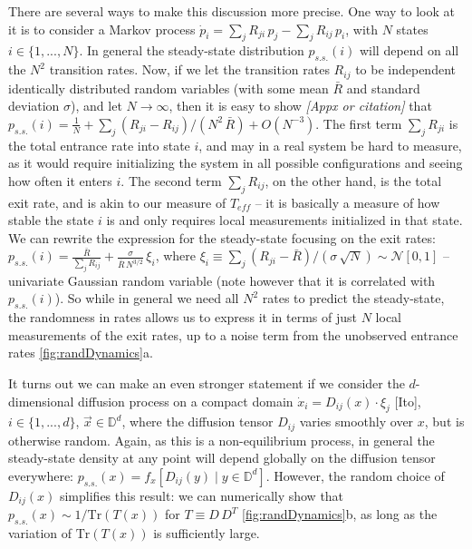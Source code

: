 \documentclass[reprint,prx]{revtex4-1}
\renewcommand{\v}[1]{\ensuremath{\vec{#1}}} %
\newcommand{\tr}{\mbox{Tr}}
\renewcommand{\=}[1]{\stackrel{#1}{=}} %
\renewcommand{\(}{\left (}
\renewcommand{\)}{\right  )}
\renewcommand{\[}{\left [}
\renewcommand{\]}{\right ]}
\newcommand{\<}{\left <}
\renewcommand{\>}{\right >}
\theoremstyle{definition}
\theoremstyle{remark}
\newcommand{\bigO}[1]{O(#1)}  %
\renewcommand{\todo}[1]{\textit{\color{red}[#1]}}
\begin{document}
There are several ways to make this discussion more precise. One way to look at it is to consider a Markov process $ \dot{p}_i= \sum_j R_{ji}\, p_j - \sum_j R_{ij}\, p_i $, with $ N $ states $ i\in\{1,...,N\} $. In general the steady-state distribution $ p_{s.s.}(i) $ will depend on all the $ N^2 $ transition rates. Now, if we let the transition rates $ R_{ij} $ to be independent identically distributed random variables (with some mean $ \bar{R} $ and standard deviation $ \sigma $), and let $ N \rightarrow \infty$, then it is easy to show \todo{Appx or citation} that $ p_{s.s.}(i)= \frac{1}{N} + \sum_j (R_{ji} - R_{ij})/(N^2\,\bar{R}) + \bigO{N^{-3}}$. The first term $ \sum_j R_{ji} $ is the total entrance rate into state $ i $, and may in a real system be hard to measure, as it would require initializing the system in all possible configurations and seeing how often it enters $ i $. The second term $ \sum_j R_{ij} $, on the other hand, is the total exit rate, and is akin to our measure of $ T_{eff} $ -- it is basically a measure of how stable the state $ i $ is and only requires local measurements initialized in that state. We can rewrite the expression for the steady-state focusing on the exit rates: $ p_{s.s.}(i)= \frac{\bar{R}}{\sum_j R_{ij}} + \frac{\sigma}{\bar{R}\,N^{3/2}}\, \xi_i$, where $ \xi_i \equiv  \sum_j \(R_{ji}-\bar{R}\)/\(\sigma\,\sqrt{N}\)\sim 
\mathcal{N}[0,1]$ -- univariate Gaussian random variable (note however that it is correlated with $ p_{s.s.}(i) $). So while in general we need all $ N^2 $ rates to predict the steady-state, the randomness in rates allows us to express it in terms of just $ N $ local measurements of the exit rates, up to a noise term from  the unobserved entrance rates \ref{fig:randDynamics}a.

It turns out we can make an even stronger statement if we consider the $ d $-dimensional diffusion process on a compact domain $ \dot{x}_i = D_{ij}(x)\cdot\xi_j $ [Ito], $ i\in\{1,...,d\} $, $ \v{x}\in\mathbb{D}^d $, where the diffusion tensor $ D_{ij} $ varies smoothly over $ x $, but is otherwise random. Again, as this is a non-equilibrium process, in general the steady-state density at any point will depend globally on the diffusion tensor everywhere: $ p_{s.s.}(x) = f_x\[D_{ij}(y)\; |\; y\in \mathbb{D}^d \]$. However, the random choice of $ D_{ij}(x) $ simplifies this result: we can numerically show that $ p_{s.s.}(x) \sim 1/\tr\(T(x)\) $ for $ T \equiv D\, D^T$ \ref{fig:randDynamics}b, as long as the variation of $ \tr\(T(x)\) $ is sufficiently large. 
\end{document}
